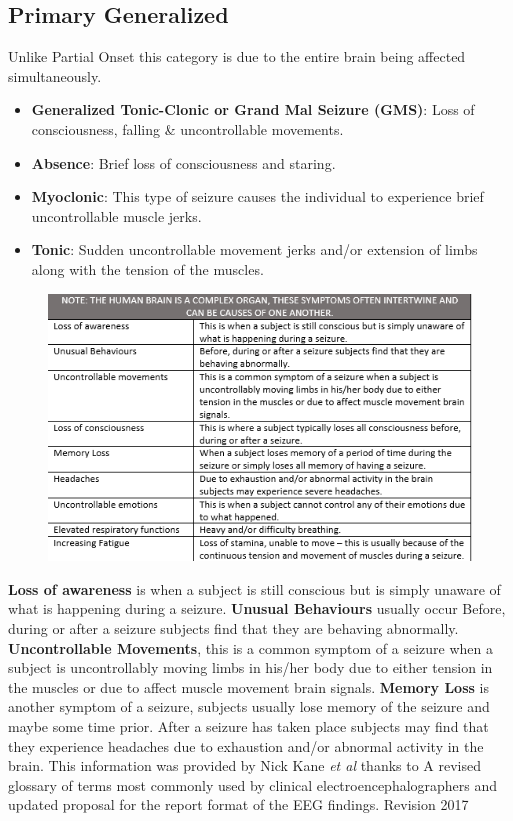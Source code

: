 \documentclass[twocolumn, 10pt, conference]{ieeetran}
\begin{document}
\subsection{Primary Generalized}
Unlike Partial Onset this category is due to the entire brain being affected simultaneously.
\begin{itemize}
	\item \textbf{Generalized Tonic-Clonic or Grand Mal Seizure (GMS)}: Loss of consciousness, falling \& uncontrollable movements. 
	\item \textbf{Absence}: Brief loss of consciousness and staring.
	\item \textbf{Myoclonic}: This type of seizure causes the individual to experience brief uncontrollable muscle jerks.
	\item \textbf{Tonic}: Sudden uncontrollable movement jerks and/or extension of limbs along with the tension of the muscles.
\end{itemize}
\begin{figure}[h]
	\centering
	\includegraphics[width=1\linewidth]{Table}
	\caption{}
	\label{fig:table}
\end{figure}

\textbf{Loss of awareness} is when a subject is still conscious but is simply unaware of what is happening during a seizure. \textbf{Unusual Behaviours} usually occur Before, during or after a seizure subjects find that they are behaving abnormally. \textbf{Uncontrollable Movements}, this is a common symptom of a seizure when a subject is uncontrollably moving limbs in his/her body due to either tension in the muscles or due to affect muscle movement brain signals. \textbf{Memory Loss} is another symptom of a seizure, subjects usually lose memory of the seizure and maybe some time prior. After a seizure has taken place subjects may find that they experience headaches due to exhaustion and/or abnormal activity in the brain.
This information was provided by Nick Kane \textit{et al} thanks to A revised glossary of terms most commonly used by clinical electroencephalographers and updated proposal for the report format of the EEG findings. Revision 2017 \cite{kane2017revised}
\end{document}
